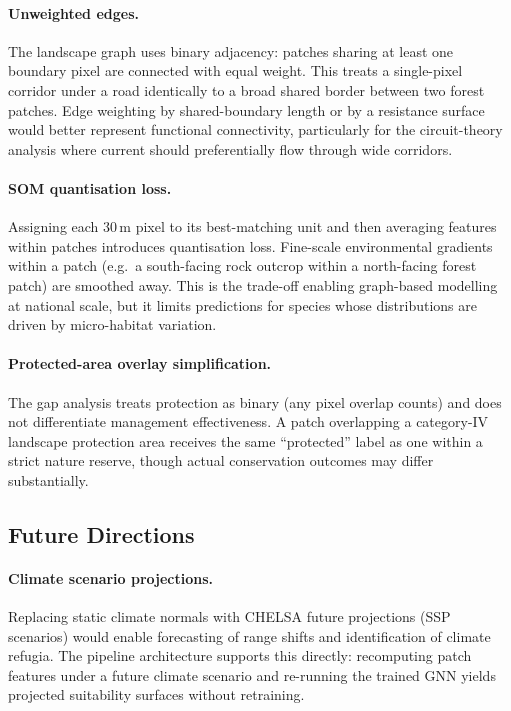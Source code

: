 \paragraph{Unweighted edges.}
The landscape graph uses binary adjacency: patches sharing
at least one boundary pixel are connected with equal
weight. This treats a single-pixel corridor under a road
identically to a broad shared border between two forest
patches. Edge weighting by shared-boundary length or by a
resistance surface would better represent functional
connectivity, particularly for the circuit-theory
analysis where current should preferentially flow through
wide corridors.

\paragraph{SOM quantisation loss.}
Assigning each 30\,m pixel to its best-matching unit and
then averaging features within patches introduces
quantisation loss. Fine-scale environmental gradients
within a patch (e.g.\ a south-facing rock outcrop within
a north-facing forest patch) are smoothed away. This is
the trade-off enabling graph-based modelling
at national scale, but it limits predictions for species
whose distributions are driven by micro-habitat variation.

\paragraph{Protected-area overlay simplification.}
The gap analysis treats protection as binary (any pixel
overlap counts) and does not differentiate management
effectiveness. A patch overlapping a category-IV landscape
protection area receives the same ``protected'' label as
one within a strict nature reserve, though actual
conservation outcomes may differ substantially.

\subsection{Future Directions}
\label{sec:future}

\paragraph{Climate scenario projections.}
Replacing static climate normals with CHELSA future
projections (SSP scenarios) would enable forecasting of
range shifts and identification of climate refugia.
The pipeline architecture supports this directly:
recomputing patch features under a future climate scenario
and re-running the trained GNN yields projected
suitability surfaces without retraining.

